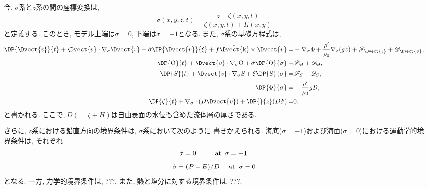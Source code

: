 \documentclass[a4j,12pt,openbib,oneside]{jreport}
\def\univec#1{ \hat{ \Dvect{\rm #1}} }
\begin{document}
今, $\sigma$系と$z$系の間の座標変換は, 
\begin{equation}
 \sigma(x,y,z,t) =　\dfrac{z - \zeta(x,y,t)}{\zeta(x,y,t) + H(x,y)} 
\end{equation}
と定義する. 
このとき, モデル上端は$\sigma=0$, 下端は$\sigma=-1$となる. 
また, $\sigma$系の基礎方程式は, 
\begin{align}
  \DP{\Dvect{v}}{t} + \Dvect{v} \cdot \nabla_\sigma \Dvect{v} + \dot{\sigma} \DP{\Dvect{v}}{\xi} + f \univec{k} \times \Dvect{v} 
 =& - \nabla_\sigma \Phi + \dfrac{\rho'}{\rho_0} \nabla_\sigma (gz) 
  + \mathscr{F}_{\Dvect{v}} + \mathscr{D}_{\Dvect{v}}, \label{hmotion_Eq_SigCoord} \\
   \DP{\Theta}{t} + \Dvect{v}\cdot\nabla_\sigma\Theta + \dot{\sigma} \DP{\Theta}{\sigma} 
 =& \mathscr{F}_\Theta + \mathscr{D}_\Theta, \label{ptemp_Eq_SigCoord} \\
   \DP{S}{t} + \Dvect{v}\cdot\nabla_\sigma S + \dot{\xi}\DP{S}{\sigma} 
 =& \mathscr{F}_S + \mathscr{D}_S, \label{salt_Eq_SigCoord} \\
  \DP{\Phi}{\sigma} =& - \dfrac{\rho'}{\rho_0} gD, \label{hydrostatic_Eq_SigCoord} \\
  \DP{\zeta}{t} + \nabla_\sigma \cdot (D \Dvect{v}) + \DP{}{z}(D \dot{\sigma}) =& 0 \label{continious_Eq_SigCoord}. 
\end{align}
と書かれる. 
ここで, $D(=\zeta+H)$は自由表面の水位も含めた流体層の厚さである. 

さらに, $z$系における鉛直方向の境界条件は, $\sigma$系において次のように
書きかえられる. 
海底($\sigma=-1$)および海面($\sigma=0$)における運動学的境界条件は, 
それぞれ
\begin{equation}
 \dot{\sigma} = 0 \;\;\;\;\;\;\;\;\;\; {\rm at} \;\; \sigma=-1,
\end{equation}
\begin{equation}
 \dot{\sigma} = (P-E)/D \;\;\;\;\;     {\rm at} \;\; \sigma=0
\end{equation}
となる. 
一方, 力学的境界条件は, ???.
また, 熱と塩分に対する境界条件は, ???.

%
\end{document}
